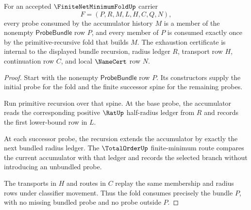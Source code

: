 \begin{theorem}
\label{thm:finitenetminimumfold-nonempty-probe-exhaustion}
For an accepted $\FiniteNetMinimumFoldUp$ carrier
$$
F=(P,R,M,L,H,C,Q,N),
$$
every probe consumed by the accumulator history $M$ is a member of the nonempty $\mathsf{ProbeBundle}$ row $P$, and every member of $P$ is consumed exactly once by the primitive-recursive fold that builds $M$. The exhaustion certificate is internal to the displayed bundle recursion, radius ledger $R$, transport row $H$, continuation row $C$, and local $\NameCert$ row $N$.
\end{theorem}
\begin{proof}
Start with the nonempty $\mathsf{ProbeBundle}$ row $P$. Its constructors supply the initial probe for the fold and the finite successor spine for the remaining probes.

Run primitive recursion over that spine. At the base probe, the accumulator reads the corresponding positive $\RatUp$ half-radius ledger from $R$ and records the first lower-bound row in $L$.

At each successor probe, the recursion extends the accumulator by exactly the next bundled radius ledger. The $\TotalOrderUp$ finite-minimum route compares the current accumulator with that ledger and records the selected branch without introducing an unbundled probe.

The transports in $H$ and routes in $C$ replay the same membership and radius rows under classifier movement. Thus the fold consumes precisely the bundle $P$, with no missing bundled probe and no probe outside $P$.
\end{proof}

